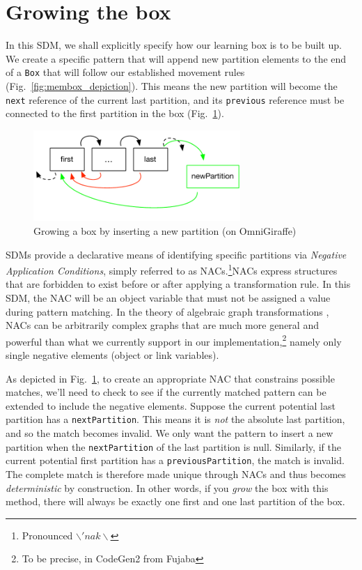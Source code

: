 \newpage
\section{Growing the box}
\genHeader

In this SDM, we shall explicitly specify how our learning box is to be built up. We create a specific pattern that will append new partition elements to the end
of a \texttt{Box} that will follow our established movement rules (Fig.~\ref{fig:membox_depiction}). This means the new partition will become the \texttt{next}
reference of the current last partition, and its \texttt{previous} reference must be connected to the first partition in the box (Fig.~\ref{fig:goal_grow}).

\begin{figure}[htbp]
 	\centering
  	\includegraphics[width=0.7\textwidth]{growBoxNACGoal.pdf}
	\caption{Growing a box by inserting a new partition \update (on OmniGiraffe)}
	\label{fig:goal_grow}
\end{figure}
\FloatBarrier

SDMs provide a declarative means of identifying specific partitions via \emph{Negative Application Conditions}, simply referred to as
\mbox{NAC}s.\footnote{Pronounced $\backslash 'nak \backslash$}\mbox{NAC}s express structures that are forbidden to exist before or after applying a
transformation rule. In this SDM, the \mbox{NAC} will be an object variable that must not be assigned a value during pattern matching. In the theory of
algebraic graph transformations \cite{EEPT06}, \mbox{NACs} can be arbitrarily complex graphs that are much more general and powerful than what we currently
support in our implementation,\footnote{To be precise, in CodeGen2 from Fujaba} namely only single negative elements (object or link variables).

As depicted in Fig.~\ref{fig:goal_grow}, to create an appropriate \mbox{NAC} that constrains possible matches, we'll need to check to see if the currently
matched pattern can be extended to include the negative elements. Suppose the current potential last partition has a \texttt{nextPartition}. This means it
is \emph{not} the absolute last partition, and so the match becomes invalid. We only want the pattern to insert a new partition when the \texttt{nextPartition}
of the last partition is null. Similarly, if the current potential first partition has a \texttt{previousPartition}, the match is invalid. The complete match is
therefore made unique through NACs and thus becomes \emph{deterministic} by construction. In other words, if you \emph{grow} the box with this method, there
will always be exactly one first and one last partition of the box.

